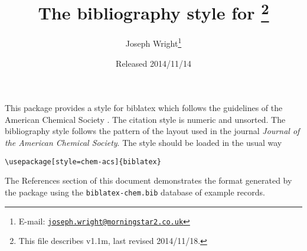 \documentclass[a4paper]{ltxdoc}
\author{Joseph Wright\thanks{E-mail: 
  \href{mailto:joseph.wright@morningstar2.co.uk}
  {\texttt{joseph.wright@morningstar2.co.uk}}}}
\title{The \pkg{chem-acs} bibliography style for \pkg{biblatex}%
  \footnote{This file describes v1.1m, last revised 2014/11/18.}}
\date{Released 2014/11/14}
\providecommand*{\pkg}[1]{\textsf{#1}}
\begin{document}
\maketitle

This package provides a style for \pkg{biblatex} which follows the
guidelines of the American Chemical Society \autocite{Coghill2006}.
The citation style is numeric
and unsorted. The bibliography style follows the pattern of the layout
used in the journal \emph{Journal of the American Chemical Society}. The
style should be loaded in the usual way
\begin{verbatim}
\usepackage[style=chem-acs]{biblatex}
\end{verbatim}
The References section of this document demonstrates the format 
generated by the package using the \texttt{biblatex-chem.bib} database
of example records.

\nocite{*}

\printbibliography
\end{document}
